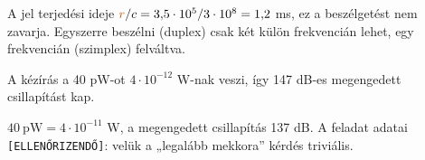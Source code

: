 A jel terjedési ideje ${\cb{r}}/c=3{,}5\cdot10^5/3\cdot10^8=1{,}2$ ms, ez a beszélgetést nem zavarja. Egyszerre beszélni (duplex) csak két külön frekvencián lehet, egy frekvencián (szimplex) felváltva.
\begin{tipp}
A kézírás a 40 pW-ot $4\cdot10^{-12}$ W-nak veszi, így 147 dB-es megengedett csillapítást kap.
\end{tipp}
\begin{figyelem}[Javítás]
$40\ \text{pW}=4\cdot10^{-11}$ W, a megengedett csillapítás 137 dB. A feladat adatai \texttt{[ELLENŐRIZENDŐ]}: velük a „legalább mekkora” kérdés triviális.
\end{figyelem}
\begin{eredmeny}

\begin{center}\end{center}
\end{eredmeny}


